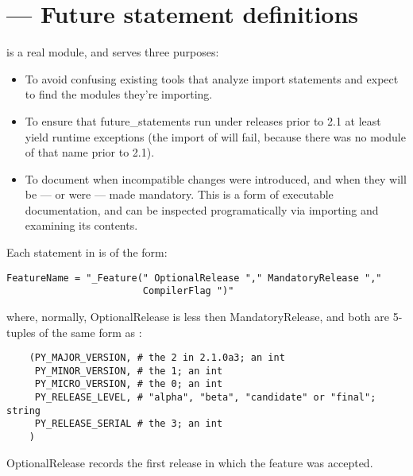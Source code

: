 \section{ ---
         Future statement definitions}


 is a real module, and serves three purposes:

\begin{itemize}

\item To avoid confusing existing tools that analyze import statements
      and expect to find the modules they're importing.

\item To ensure that future_statements run under releases prior to 2.1
      at least yield runtime exceptions (the import of
       will fail, because there was no module of
      that name prior to 2.1). 

\item To document when incompatible changes were introduced, and when they
      will be --- or were --- made mandatory.  This is a form of executable
      documentation, and can be inspected programatically via importing
       and examining its contents.

\end{itemize}

Each statement in  is of the form:

\begin{verbatim}
FeatureName = "_Feature(" OptionalRelease "," MandatoryRelease ","
                        CompilerFlag ")"
\end{verbatim}

where, normally, OptionalRelease is less then MandatoryRelease, and
both are 5-tuples of the same form as :

\begin{verbatim}
    (PY_MAJOR_VERSION, # the 2 in 2.1.0a3; an int
     PY_MINOR_VERSION, # the 1; an int
     PY_MICRO_VERSION, # the 0; an int
     PY_RELEASE_LEVEL, # "alpha", "beta", "candidate" or "final"; string
     PY_RELEASE_SERIAL # the 3; an int
    )
\end{verbatim}

OptionalRelease records the first release in which the feature was
accepted. 

